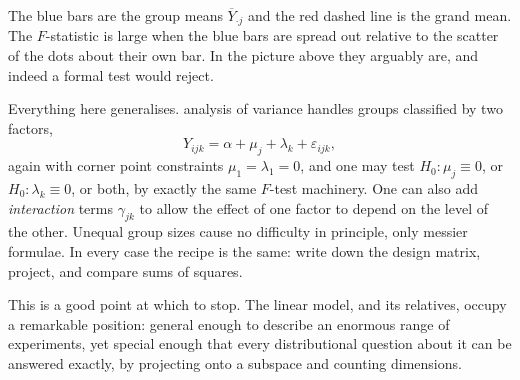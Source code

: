 \begin{center}
\end{center}

The blue bars are the group means $\overline{Y}_{\cdot j}$ and the red dashed line is the grand mean. The $F$-statistic is large when the blue bars are spread out relative to the scatter of the dots about their own bar. In the picture above they arguably are, and indeed a formal test would reject.

\begin{remark}
  Everything here generalises.  analysis of variance handles groups classified by two factors,
  $$
  Y_{ijk} = \alpha + \mu_j + \lambda_k + \varepsilon_{ijk},
  $$
  again with corner point constraints $\mu_1 = \lambda_1 = 0$, and one may test $H_0 : \mu_j \equiv 0$, or $H_0 : \lambda_k \equiv 0$, or both, by exactly the same $F$-test machinery. One can also add \emph{interaction} terms $\gamma_{jk}$ to allow the effect of one factor to depend on the level of the other. Unequal group sizes cause no difficulty in principle, only messier formulae. In every case the recipe is the same: write down the design matrix, project, and compare sums of squares.
\end{remark}

This is a good point at which to stop. The linear model, and its relatives, occupy a remarkable position: general enough to describe an enormous range of experiments, yet special enough that every distributional question about it can be answered exactly, by projecting onto a subspace and counting dimensions.


